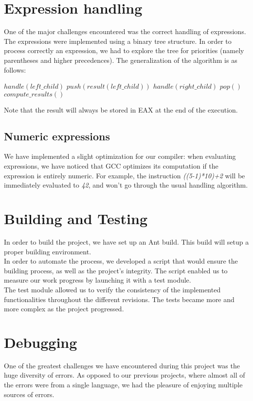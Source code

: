 \documentclass{article}
\begin{document}
\section{Expression handling}
One of the major challenges encountered was the correct handling of expressions.
The expressions were implemented using a binary tree structure. In order to process correctly an expression, we had to explore the tree for priorities (namely parentheses and higher precedences). The generalization of the algorithm is as follows:

\begin{algorithmic}
\State $handle(left\_child)$
\State $push(result(left\_child))$
\State $handle(right\_child)$
\State $pop()$
\State $compute\_results()$
\EndIf
\end{algorithmic}

Note that the result will always be stored in EAX at the end of the execution.

\subsection{Numeric expressions}
We have implemented a slight optimization for our compiler: when evaluating expressions, we have noticed that GCC optimizes its computation if the expression is entirely numeric. For example, the instruction \emph{((5-1)*10)+2} will be immediately evaluated to \emph{42}, and won't go through the usual handling algorithm.

\section{Building and Testing}
In order to build the project, we have set up an Ant build. This build will setup a proper building environment.\\
In order to automate the process, we developed a script that would ensure the building process, as well as the project's integrity. The script enabled us to measure our work progress by launching it with a test module.\\
The test module allowed us to verify the consistency of the implemented functionalities throughout the different revisions. The tests became more and more complex as the project progressed.

\section{Debugging}
One of the greatest challenges we have encountered during this project was the huge diversity of errors. As opposed to our previous projects, where almost all of the errors were from a single language, we had the pleasure of enjoying multiple sources of errors.\\
\end{document}
